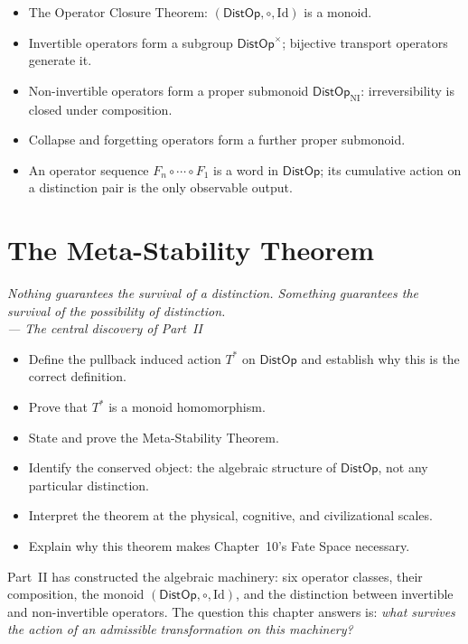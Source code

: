 \documentclass[12pt,twoside,openright]{book}
\newcommand{\distOp}{\mathsf{DistOp}}
\newenvironment{epigraph}[2]{%
  \vspace{1em}\begin{flushright}
  \begin{minipage}{0.72\textwidth}
  \itshape\small #1\\[0.4em]
  \upshape\footnotesize\sffamily\color{DistGray}--- #2
  \end{minipage}\end{flushright}\vspace{1.5em}}{}
\newenvironment{objectives}{%
  \begin{tcolorbox}[colback=DistBlue!5,colframe=DistBlue,
    title={\faCheckCircle\enspace Chapter Objectives},
    fonttitle=\sffamily\bfseries\color{white},
    attach boxed title to top left={yshift=-2mm,xshift=4mm},
    boxed title style={colback=DistBlue},breakable]
  \begin{itemize}[leftmargin=*,nosep]}{%
  \end{itemize}\end{tcolorbox}\vspace{1em}}
\newenvironment{chapsummary}{%
  \begin{tcolorbox}[colback=DistBlue!5,colframe=DistBlue,
    title={\faBookOpen\enspace Summary},
    fonttitle=\sffamily\bfseries\color{white},
    attach boxed title to top left={yshift=-2mm,xshift=4mm},
    boxed title style={colback=DistBlue,rounded corners}]
  \begin{itemize}[nosep,leftmargin=*]}{%
  \end{itemize}\end{tcolorbox}}
\providecommand{\distOpNI}{\distOp_{\mathrm{NI}}}
\providecommand{\distOpInv}{\distOp^{\times}}
\begin{document}
\begin{chapsummary}
\item The Operator Closure Theorem: $(\distOp,\circ,\mathrm{Id})$
  is a monoid.
\item Invertible operators form a subgroup $\distOpInv$;
  bijective transport operators generate it.
\item Non-invertible operators form a proper submonoid
  $\distOpNI$: irreversibility is closed under composition.
\item Collapse and forgetting operators form a further proper
  submonoid.
\item An operator sequence $F_n\circ\cdots\circ F_1$ is a
  word in $\distOp$; its cumulative action on a distinction
  pair is the only observable output.
\end{chapsummary}


\chapter{The Meta-Stability Theorem}
\label{ch:meta-stability}

\begin{epigraph}{Nothing guarantees the survival of a
  distinction. Something guarantees the survival of the
  possibility of distinction.}{The central discovery of
  Part~II}
\end{epigraph}

\begin{objectives}
\item Define the pullback induced action $T^*$ on $\distOp$
  and establish why this is the correct definition.
\item Prove that $T^*$ is a monoid homomorphism.
\item State and prove the Meta-Stability Theorem.
\item Identify the conserved object: the algebraic structure
  of $\distOp$, not any particular distinction.
\item Interpret the theorem at the physical, cognitive, and
  civilizational scales.
\item Explain why this theorem makes Chapter~10's Fate Space
  necessary.
\end{objectives}

Part~II has constructed the algebraic machinery: six operator
classes, their composition, the monoid $(\distOp,\circ,
\mathrm{Id})$, and the distinction between invertible and
non-invertible operators. The question this chapter answers is:
\emph{what survives the action of an admissible transformation
on this machinery?}
\end{document}
